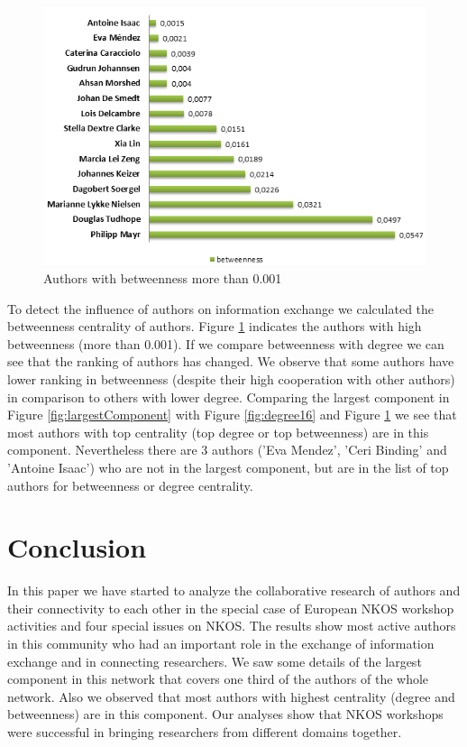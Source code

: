\documentclass[runningheads,a4paper]{llncs}
\begin{document}
\begin{figure} 
	\centering
	\includegraphics[width=0.8\linewidth]{betweenness}
	\caption{Authors with betweenness more than 0.001}
	\label{fig:betweenness}
\end{figure}

To detect the influence of authors on information exchange we calculated the betweenness centrality of authors. Figure \ref{fig:betweenness} indicates the authors with high betweenness (more than 0.001). If we compare betweenness with degree we can see that the ranking of authors has changed. We observe that some authors have lower ranking in betweenness (despite their high cooperation with other authors) in comparison to others with lower degree. Comparing the largest component in Figure \ref{fig:largestComponent} with Figure \ref{fig:degree16} and Figure \ref{fig:betweenness} we see that most authors with top centrality (top degree or top betweenness) are in this component. Nevertheless there are 3 authors ('Eva Mendez', 'Ceri Binding' and 'Antoine Isaac') who are not in the largest component, but are in the list of top authors for betweenness or degree centrality.



\section{Conclusion}\label{concl}
In this paper we have started to analyze the collaborative research of authors and their connectivity to each other in the special case of European NKOS workshop activities and four special issues on NKOS. The results show most active authors in this community who had an important role in the exchange of information exchange and in connecting researchers. We saw some details of the largest component in this network that covers one third of the authors of the whole network. Also we observed that most authors with highest centrality (degree and betweenness) are in this component. Our analyses show that NKOS workshops were successful in bringing researchers from different domains together.  
\end{document}
